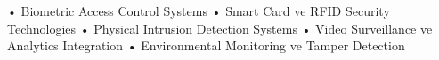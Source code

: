 • Biometric Access Control Systems
• Smart Card ve RFID Security Technologies
• Physical Intrusion Detection Systems
• Video Surveillance ve Analytics Integration
• Environmental Monitoring ve Tamper Detection